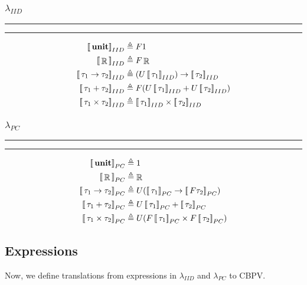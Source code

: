 \documentclass{article}
\DeclareMathOperator*\R{\mathbb{R}}
\DeclareMathOperator*\llb{[\![}
\DeclareMathOperator*\rrb{]\!]}
\begin{document}
\begin{multicols}{2}
\subsubsection*{$\lambda_{IID}$}
\hrule\hrule
\medskip
	\begin{equation*}
		\begin{split}
			\llb {\bf unit} {\rrb}_{IID} &\triangleq F 1 \\
			\llb \R {\rrb}_{IID} &\triangleq F \R \\
			\llb \tau_1 \to \tau_2 {\rrb}_{IID} &\triangleq (U \llb \tau_1 {\rrb}_{IID}) \to \llb \tau_2 {\rrb}_{IID}\\
			\llb \tau_1 + \tau_2 {\rrb}_{IID} &\triangleq F(U\llb \tau_1 {\rrb}_{IID} + U\llb \tau_2 {\rrb}_{IID})\\
			\llb \tau_1 \times \tau_2 {\rrb}_{IID} &\triangleq \llb \tau_1 {\rrb}_{IID} \times \llb \tau_2 {\rrb}_{IID}\\
		\end{split}
	\end{equation*}
		
\subsubsection*{$\lambda_{PC}$}
\hrule\hrule
\medskip
	\begin{equation*}
		\begin{split}
			\llb {\bf unit} {\rrb}_{PC} &\triangleq 1 \\
			\llb \R {\rrb}_{PC} &\triangleq \R \\
			\llb \tau_1 \to \tau_2 {\rrb}_{PC} &\triangleq U (\llb \tau_1 {\rrb}_{PC} \to \llb F\tau_2 {\rrb}_{PC})\\
			\llb \tau_1 + \tau_2 {\rrb}_{PC} &\triangleq U\llb \tau_1 {\rrb}_{PC} + \llb \tau_2 {\rrb}_{PC}\\
			\llb \tau_1 \times \tau_2 {\rrb}_{PC} &\triangleq U(F\llb\tau_1{\rrb}_{PC} \times F\llb\tau_2{\rrb}_{PC})\\
		\end{split}
	\end{equation*}
\end{multicols}

\subsection{Expressions}
Now, we define translations from expressions in $\lambda_{IID}$ and $\lambda_{PC}$
to CBPV.
\end{document}
